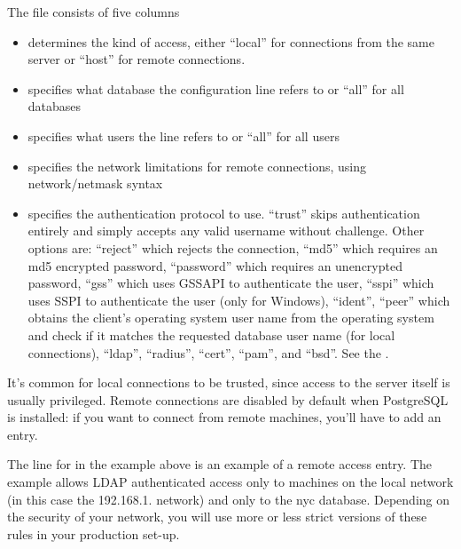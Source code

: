 \documentclass[a4paper,11pt,english]{sphinxmanual}
\begin{document}
The file consists of five columns
\begin{itemize}
\item {} 
 determines the kind of access, either “local” for connections from the same server or “host” for remote connections.

\item {} 
 specifies what database the configuration line refers to or “all” for all databases

\item {} 
 specifies what users the line refers to or “all” for all users

\item {} 
 specifies the network limitations for remote connections, using network/netmask syntax

\item {} 
 specifies the authentication protocol to use. “trust” skips authentication entirely and simply accepts any valid username without challenge. Other options are: “reject” which rejects the connection, “md5” which requires an md5 encrypted password, “password” which requires an unencrypted password, “gss” which uses GSSAPI to authenticate the user, “sspi” which uses SSPI to authenticate the user (only for Windows), “ident”, “peer” which obtains the client’s operating system user name from the operating system and check if it matches the requested database user name (for local connections), “ldap”, “radius”, “cert”, “pam”, and “bsd”. See the .

\end{itemize}

It’s common for local connections to be trusted, since access to the server itself is usually privileged. Remote connections are disabled by default when PostgreSQL is installed: if you want to connect from remote machines, you’ll have to add an entry.

The line for  in the example above is an example of a remote access entry. The  example allows LDAP authenticated access only to machines on the local network (in this case the 192.168.1. network) and only to the nyc database. Depending on the security of your network, you will use more or less strict versions of these rules in your production set-up.
\end{document}
